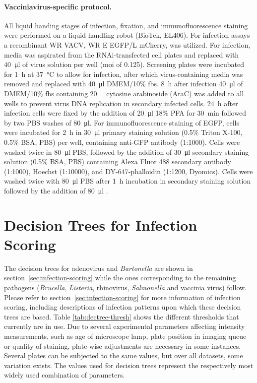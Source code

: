 \paragraph{Vacciniavirus-specific protocol.}
All liquid handing stages of infection, fixation, and immunofluorescence staining were performed on a liquid handling robot (BioTek, EL406). For infection assays a recombinant WR VACV, WR E EGFP\slash L mCherry, was utilized. For infection, media was aspirated from the RNAi-transfected cell plates and replaced with \SI{40}{\micro\litre} of virus solution per well (\gls{moi} of 0.125). Screening plates were incubated for \SI{1}{\hour} at \SI{37}{\celsius} to allow for infection, after which virus-containing media was removed and replaced with \SI{40}{\micro\litre} DMEM\slash 10\% \gls{fbs}. \SI{8}{\hour} after infection \SI{40}{\micro\litre} of DMEM\slash 10\% \gls{fbs} containing \SI{20}{\micro\Molar} cytosine arabinoside (AraC) was added to all wells to prevent virus DNA replication in secondary infected cells. \SI{24}{\hour} after infection cells were fixed by the addition of \SI{20}{\micro\litre} 18\% PFA for \SI{30}{\minute} followed by two PBS washes of \SI{80}{\micro\litre}. For immunofluorescence staining of EGFP, cells were incubated for \SI{2}{\hour} in \SI{30}{\micro\litre} primary staining solution (0.5\% Triton X-100, 0.5\% BSA, PBS) per well, containing anti-GFP antibody (1:1000). Cells were washed twice in \SI{80}{\micro\litre} PBS, followed by the addition of \SI{30}{\micro\litre} secondary staining solution (0.5\% BSA, PBS) containing Alexa Fluor 488 secondary antibody (1:1000), Hoechst (1:10000), and DY-647-phalloidin (1:1200, Dyomics). Cells were washed twice with \SI{80}{\micro\litre} PBS after \SI{1}{\hour} incubation in secondary staining solution followed by the addition of \SI{80}{\micro\litre} .

\section{Decision Trees for Infection Scoring}
\label{sec:app-dectree}
The decision trees for adenovirus and \textit{Bartonella} are shown in section~\ref{sec:infection-scoring} while the ones corresponding to the remaining pathogens (\textit{Brucella}, \textit{Listeria}, rhinovirus, \textit{Salmonella} and vaccinia virus) follow. Please refer to section~\ref{sec:infection-scoring} for more information of infection scoring, including descriptions of infection patterns upon which these decision trees are based. Table \ref{tab:dectree-thresh} shows the different thresholds that currently are in use. Due to several experimental parameters affecting intensity measurements, such as age of microscope lamp, plate position in imaging queue or quality of staining, plate-wise adjustments are necessary in some instances. Several plates can be subjected to the same values, but over all datasets, some variation exists. The values used for decision trees represent the respectively most widely used combination of parameters.

